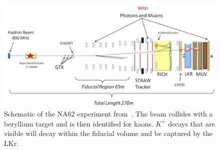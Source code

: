 \begin{figure}[h]
    \centering
    \includegraphics[width=\textwidth]{Figures/experiments/na62_schematic}
    \caption{Schematic of the NA62 experiment from~\cite{Martellotti:2015kna}. The beam collides with a beryllium target and is then identified for kaons. $K^+$ decays that are visible will decay within the fiducial volume and be captured by the LKr.}
    \label{fig:na62_experiment}
\end{figure}
